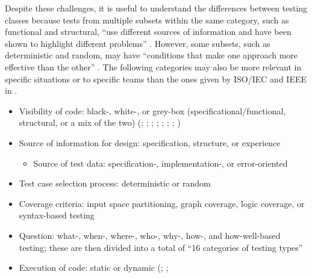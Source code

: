 Despite these challenges, it is useful to understand the differences between
testing classes because tests from multiple subsets within the same category,
such as functional and structural, ``use different sources of information and
have been shown to highlight different problems'' \citep[p.~5-16]{SWEBOK2024}.
However, some subsets, such as deterministic and random, may have ``conditions
that make one approach more effective than the other''
\citep[p.~5-16]{SWEBOK2024}. The following categories may also be more relevant
in specific situations or to specific teams than the ones given by ISO/IEC and
IEEE in .

\begin{itemize}
    \item Visibility of code: black-, white-, or grey-box
          (specificational/functional, structural, or a mix of the two)
          (\citealp[p.~8]{IEEE2021}; \citealp[pp.~5-10,~5-16]{SWEBOK2024};
          \citealp[p.~601, called ``testing approaches'' and (stepwise) code
              reading replaced ``grey-box testing'']{SharmaEtAl2021};
          \citealp[pp.~57-58]{AmmannAndOffutt2017};
          \citealp[p.~213]{KuļešovsEtAl2013};
          \citealp[pp.~53,~218]{Patton2006}; \citealp[p.~69]{Perry2006};
          \citealp[pp.~4-5, called ``testing methods'']{Kam2008})
    \item Source of information for design: specification, structure, or
          experience \citep[p.~8]{IEEE2021}
          \begin{itemize}
              \item Source of test data: specification-, implementation-,
                    or error-oriented \citep[p.~440]{PetersAndPedrycz2000}
          \end{itemize}
    \item Test case selection process: deterministic or random
          \citep[p.~5-16]{SWEBOK2024}
    \item Coverage criteria: input space partitioning, graph coverage, logic
          coverage, or syntax-based testing \citep[pp.~18-19]{AmmannAndOffutt2017}
    \item Question: what-, when-, where-, who-, why-, how-, and how-well-based
          testing; these are then divided into a total of ``16 categories of
          testing types''
          \citep[p.~17]{Firesmith2015}
    \item Execution of code: static or dynamic
          (\citealp[p.~214]{KuļešovsEtAl2013}; \citealp[p.~12]{Gerrard2000a};

\end{itemize}
